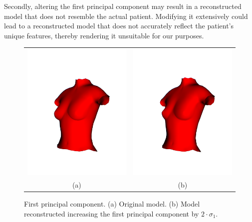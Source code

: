 Secondly, altering the first principal component may result in a reconstructed model that does not resemble the actual patient. 
Modifying it extensively could lead to a reconstructed model that does not accurately reflect the patient's unique features, thereby rendering it unsuitable for our purposes.

\begin{figure}[H]
    \centering
    \begin{tabular}{@{}cc@{}}
        \includegraphics[width=0.487\linewidth]{figures/20230529-pca_base.jpg}&
        \includegraphics[width=0.487\linewidth]{figures/20230529-pca_0_comp.jpg}\\
        (a)&(b)\\
        \end{tabular}
    \caption[First principal component]{First principal component.
    \textup{(a)} Original model.
    \textup{(b)} Model reconstructed increasing the first principal component by $2 \cdot \sigma_1$.
    }

    \label{fig:pca_0}
\end{figure}


